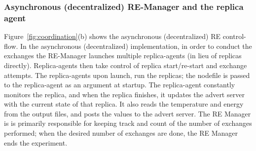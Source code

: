 \documentclass{rspublic}
\newcommand{\jhanote}[1]{ {\textcolor{red} { ***shantenu: #1 }}}
\newcommand{\alnote}[1]{ {\textcolor{blue} { ***andre: #1 }}}
\newcommand{\alnote}[1]{}
\newcommand{\jhanote}[1]{}
\begin{document}
\subsubsection{Asynchronous (decentralized) RE-Manager and the replica agent}

 

Figure~\ref{fig:coordination}(b) shows the asynchronous (decentralized)
RE control-flow.  In the asynchronous (decentralized) implementation,
in order to conduct the exchanges the RE-Manager launches multiple
replica-agents (in lieu of replicas directly).  Replica-agents then
take control of replica start/re-start and exchange attempts.  The
replica-agents upon launch, run the replicas; the nodefile is passed
to the replica-agent as an argument at startup. The replica-agent
constantly monitors the replica, and when the replica finishes, it
updates the advert server with the current state of that replica.  It
also reads the temperature and energy from the output files, and posts
the values to the advert server.  The RE Manager is is primarily
responsible for keeping track and count of the number of exchanges
performed; when the desired number of exchanges are done, the RE
Manager ends the experiment.

  

\end{document}
